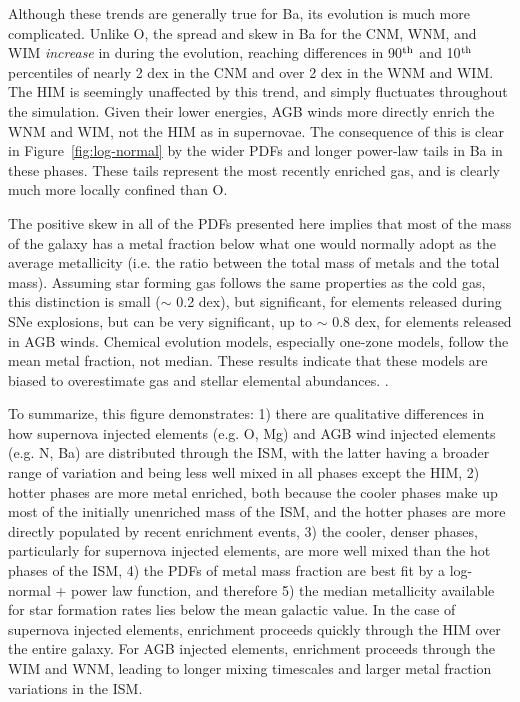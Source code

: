 \documentclass[twocolumn]{aastex61}
\begin{document}

Although these trends are generally true for Ba, its evolution is much more complicated.
Unlike O, the spread and skew in Ba for the CNM, WNM, and WIM \textit{increase} in during the evolution, reaching differences in 90$^{\rm th}$ and 10$^{\rm th}$ percentiles of nearly 2 dex in the CNM and over 2 dex in the WNM and WIM. The HIM is seemingly unaffected by this trend, and simply fluctuates throughout the simulation. Given their lower energies, AGB winds more directly enrich the WNM and WIM, not the HIM as in supernovae. The consequence of this is clear in Figure~\ref{fig:log-normal} by the wider PDFs and longer power-law tails in Ba in these phases. These tails represent the most recently enriched gas, and is clearly much more locally confined than O.

The positive skew in all of the PDFs presented here implies that most of the mass of the galaxy has a metal fraction below what one would normally adopt as the average metallicity (i.e. the ratio between the total mass of metals and the total mass). Assuming star forming gas follows the same properties as the cold gas, this distinction is small ($\sim$ 0.2 dex), but significant, for elements released during SNe explosions, but can be very significant, up to $\sim$ 0.8 dex, for elements released in AGB winds. Chemical evolution models, especially one-zone models, follow the mean metal fraction, not median. These results indicate that these models are biased to overestimate gas and stellar elemental abundances.
. %

To summarize, this figure demonstrates: 1) there are qualitative differences in how supernova injected elements (e.g. O, Mg) and AGB wind injected elements (e.g. N, Ba) are distributed through the ISM, with the latter having a broader range of variation and being less well mixed in all phases except the HIM, 2) hotter phases are more metal enriched, both because the cooler phases make up most of the initially unenriched mass of the ISM, and the hotter phases are more directly populated by recent enrichment events, 3) the cooler, denser phases, particularly for supernova injected elements, are more well mixed than the hot phases of the ISM, 4) the PDFs of metal mass fraction are best fit by a log-normal + power law function, and therefore 5) the median metallicity available for star formation rates lies below the mean galactic value. In the case of supernova injected elements, enrichment proceeds quickly through the HIM over the entire galaxy. For AGB injected elements, enrichment proceeds through the WIM and WNM, leading to longer mixing timescales and larger metal fraction variations in the ISM.
\end{document}
